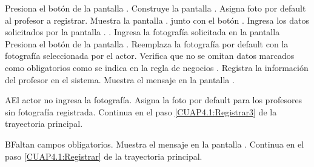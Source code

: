 	\begin{UCtrayectoria}
		\UCpaso[\UCactor] Presiona el botón  de la pantalla .
		\UCpaso[\UCsist] Construye la pantalla .
		\UCpaso[\UCsist] Asigna foto por default al profesor a registrar.
		\UCpaso[\UCsist] Muestra la pantalla . junto con el botón . 
		\UCpaso[\UCactor] Ingresa los datos solicitados por la pantalla . .\label{CUAP4.1:Registrar} 
		\UCpaso[\UCactor] Ingresa la fotografía solicitada en la pantalla
		\UCpaso Presiona el botón  de la pantalla .\label{CUAP4.1:Registrar3} 
		\UCpaso[\UCsist] Reemplaza la fotografía por default con la fotografía seleccionada por el actor.
		\UCpaso[\UCsist] Verifica que no se omitan datos marcados como obligatorios como se indica en la regla de negocios . 
		\UCpaso[\UCsist] Registra la información del profesor en el sistema. \label{CUAP4.1:Registrar2}
		\UCpaso[\UCsist] Muestra el mensaje   en la pantalla .
		
				
%		
		
	\end{UCtrayectoria}
	
		\begin{UCtrayectoriaA}{A}{El actor no ingresa la fotografía.}
		\UCpaso[\UCsist] Asigna la foto por default para los profesores sin fotografía registrada.
		\UCpaso[] Continua en el paso \ref{CUAP4.1:Registrar3} de la trayectoria principal.
	\end{UCtrayectoriaA}
	
	\begin{UCtrayectoriaA}{B}{Faltan campos obligatorios.}
		\UCpaso[\UCsist] Muestra el mensaje  en la pantalla  .
		\UCpaso[] Continua en el paso \ref{CUAP4.1:Registrar} de la trayectoria principal.
	\end{UCtrayectoriaA}
	

